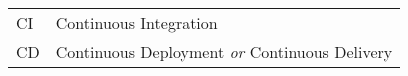 \begin{longtable}{p{3cm}p{10cm}}
CI&Continuous Integration\\
CD&Continuous Deployment \textit{or} Continuous Delivery\\
\end{longtable}
\addtocounter{table}{-1} 

